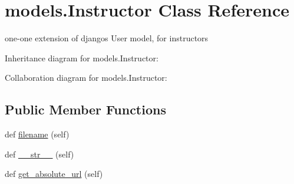 \hypertarget{classmodels_1_1_instructor}{}\section{models.\+Instructor Class Reference}
\label{classmodels_1_1_instructor}


one-\/one extension of django\textquotesingle{}s User model, for instructors  




Inheritance diagram for models.\+Instructor\+:


Collaboration diagram for models.\+Instructor\+:
\subsection*{Public Member Functions}
\begin{DoxyCompactItemize}
\item 
def \hyperlink{classmodels_1_1_instructor_a8a9bbb348fdc403a46ceb6e1438b13a1}{filename} (self)
\item 
def \hyperlink{classmodels_1_1_instructor_a3b1665694aa60e50612450f6267aac20}{\+\_\+\+\_\+str\+\_\+\+\_\+} (self)
\item 
def \hyperlink{classmodels_1_1_instructor_aba8aaef90c2431ff135737b1a15cfa82}{get\+\_\+absolute\+\_\+url} (self)
\end{DoxyCompactItemize}
